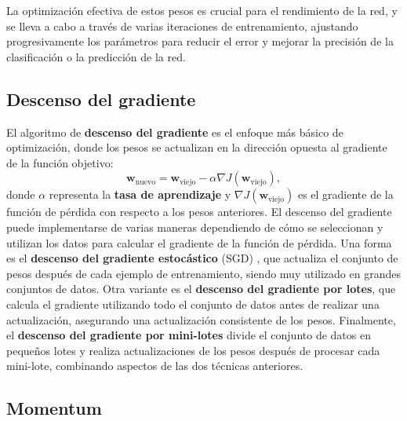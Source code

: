 La optimización efectiva de estos pesos es crucial para el rendimiento de la red,
y se lleva a cabo a través de varias iteraciones de entrenamiento, ajustando
progresivamente los parámetros para reducir el error y mejorar la precisión de
la clasificación o la predicción de la red.

\subsection{Descenso del gradiente}

El algoritmo de \textbf{descenso del gradiente} \cite{cauchy1847methode} es el
enfoque más básico de optimización, donde los pesos se actualizan en la dirección
opuesta al gradiente de la función objetivo:
\begin{equation}
	\mathbf{w}_{\text{nuevo}}= \mathbf{w}_{\text{viejo}}- \alpha \nabla J (\mathbf{w}
	_{\text{viejo}}),
\end{equation}
donde $\alpha$ representa la \textbf{tasa de aprendizaje} y $\nabla J (\mathbf{w}
_{\text{viejo}})$ es el gradiente de la función de pérdida con respecto a los pesos
anteriores. El descenso del gradiente puede implementarse de varias maneras
dependiendo de cómo se seleccionan y utilizan los datos para calcular el
gradiente de la función de pérdida. Una forma es el \textbf{descenso del
	gradiente estocástico} (SGD) \cite{10.1214/aoms/1177729392}, que actualiza el conjunto
de pesos después de cada ejemplo de entrenamiento, siendo muy utilizado en
grandes conjuntos de datos. Otra variante es el \textbf{descenso del gradiente
	por lotes}, que calcula el gradiente utilizando todo el conjunto de datos antes de
realizar una actualización, asegurando una actualización consistente de los
pesos. Finalmente, el \textbf{descenso del gradiente por mini-lotes} divide el conjunto
de datos en pequeños lotes y realiza actualizaciones de los pesos después de procesar
cada mini-lote, combinando aspectos de las dos técnicas anteriores.

\subsection{Momentum}

